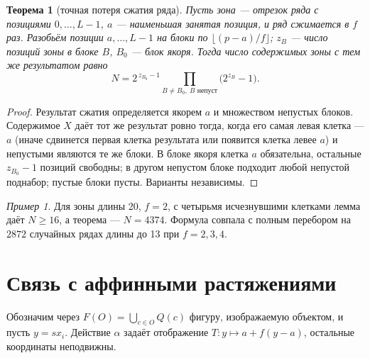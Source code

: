 \documentclass[11pt,a4paper]{article}
\theoremstyle{plain}
\newtheorem{theorem}{Теорема}
\theoremstyle{definition}
\theoremstyle{remark}
\newtheorem*{example}{Пример}
\begin{document}
\begin{theorem}[точная потеря сжатия ряда]\label{thm:exact}
Пусть зона — отрезок ряда с позициями $0,\dots,L-1$, $a$ — наименьшая занятая позиция, и ряд сжимается в $f$ раз. Разобьём позиции $a,\dots,L-1$ на блоки по $\lfloor (p-a)/f\rfloor$; $z_B$ — число позиций зоны в блоке $B$, $B_0$ — блок якоря. Тогда число содержимых зоны с тем же результатом равно
\[
N=2^{\,z_{B_0}-1}\prod_{B\ne B_0,\ B\text{ непуст}}\bigl(2^{z_B}-1\bigr).
\]
\end{theorem}
\begin{proof}
Результат сжатия определяется якорем $a$ и множеством непустых блоков. Содержимое $X$ даёт тот же результат ровно тогда, когда его самая левая клетка — $a$ (иначе сдвинется первая клетка результата или появится клетка левее $a$) и непустыми являются те же блоки. В блоке якоря клетка $a$ обязательна, остальные $z_{B_0}-1$ позиций свободны; в другом непустом блоке подходит любой непустой поднабор; пустые блоки пусты. Варианты независимы.
\end{proof}

\begin{example}
Для зоны длины 20, $f=2$, с четырьмя исчезнувшими клетками лемма даёт $N\ge16$, а теорема — $N=4374$. Формула совпала с полным перебором на $2872$ случайных рядах длины до 13 при $f=2,3,4$.
\end{example}

\section{Связь с аффинными растяжениями}\label{sec:affine}

Обозначим через $F(O)=\bigcup_{c\in O}Q(c)$ фигуру, изображаемую объектом, и пусть $y=sx_i$. Действие $\alpha$ задаёт отображение $T\colon y\mapsto a+f(y-a)$, остальные координаты неподвижны.
\end{document}
